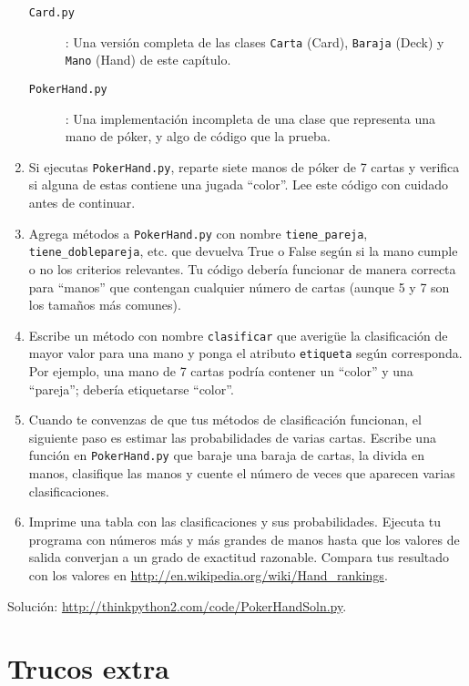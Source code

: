 \documentclass[10pt]{book}
\begin{document}
\begin{exercise}
\begin{enumerate}
\begin{description}
\item[{\tt Card.py}]: Una versión completa de las clases {\tt Carta} (Card),
{\tt Baraja} (Deck) y {\tt Mano} (Hand) de este capítulo.

\item[{\tt PokerHand.py}]: Una implementación incompleta de una clase
que representa una mano de póker, y algo de código que la prueba.

\end{description}
%
\item Si ejecutas {\tt PokerHand.py}, reparte siete manos de póker de 7 cartas
y verifica si alguna de estas contiene una jugada ``color''.  Lee este
código con cuidado antes de continuar.

\item Agrega métodos a {\tt PokerHand.py} con nombre \verb"tiene_pareja",
\verb"tiene_doblepareja", etc. que devuelva True o False según si
la mano cumple o no los criterios relevantes.  Tu código debería
funcionar de manera correcta para ``manos'' que contengan cualquier número de cartas
(aunque 5 y 7 son los tamaños más comunes).

\item Escribe un método con nombre {\tt clasificar} que averigüe
la clasificación de mayor valor para una mano y ponga el atributo
{\tt etiqueta} según corresponda.  Por ejemplo, una mano de 7 cartas
podría contener un ``color'' y una ``pareja''; debería etiquetarse ``color''.

\item Cuando te convenzas de que tus métodos de clasificación
funcionan, el siguiente paso es estimar las probabilidades de varias
cartas.  Escribe una función en {\tt PokerHand.py} que baraje una baraja de
cartas, la divida en manos, clasifique las manos y cuente el
número de veces que aparecen varias clasificaciones.

\item Imprime una tabla con las clasificaciones y sus probabilidades.
Ejecuta tu programa con números más y más grandes de manos hasta que los
valores de salida converjan a un grado de exactitud razonable.  Compara
tus resultado con los valores en \url{http://en.wikipedia.org/wiki/Hand_rankings}.

\end{enumerate}

Solución: \url{http://thinkpython2.com/code/PokerHandSoln.py}.
\end{exercise}


\chapter{Trucos extra}
\end{document}
